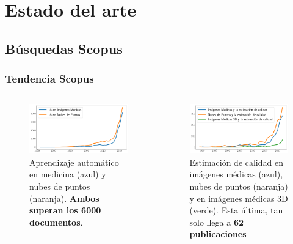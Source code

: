 \section{Estado del arte}
\subsection{Búsquedas Scopus}
\begin{frame}
    \frametitle{Tendencia Scopus}
    \begin{columns}
      \begin{figure}
        \begin{center}
          \includegraphics[width=\textwidth]{imagenes/chapter2/ScopusMLinMedicineAndPC}
        \end{center}
        \caption{Aprendizaje automático en medicina (azul) y nubes de puntos (naranja).
        \textbf{Ambos superan los 6000 documentos}.}
      \end{figure}
      
      \begin{figure}
        \begin{center}
          \includegraphics[width=\textwidth]{imagenes/chapter2/ScopusQualityAssessment}
        \end{center}
        \caption{Estimación de calidad en imágenes médicas (azul), nubes de puntos (naranja) 
          y en imágenes médicas 3D (verde). Esta última, tan solo llega a \textbf{62 publicaciones}}
      \end{figure}
    \end{columns}
\end{frame}

